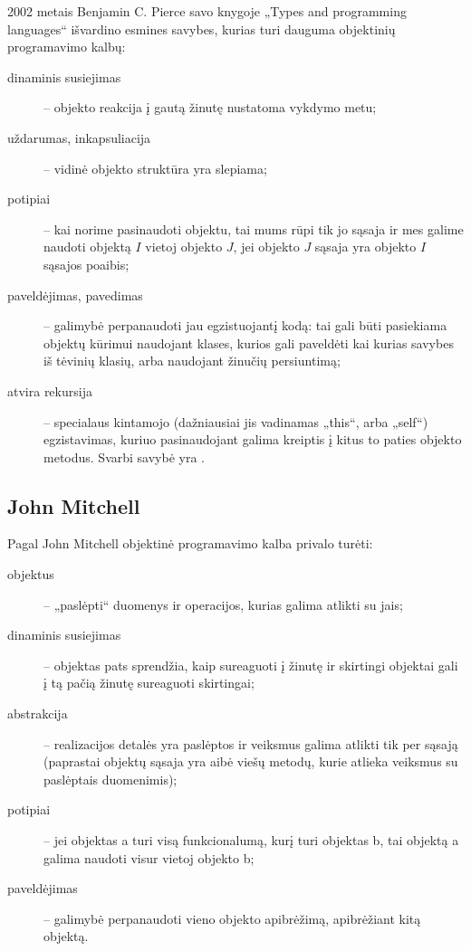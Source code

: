 2002 metais Benjamin C. Pierce savo knygoje „Types and programming
languages“\cite[225-227]{types-and-programming-languages} išvardino
esmines savybes, kurias turi dauguma objektinių programavimo kalbų: 
\begin{description}
  \item[dinaminis susiejimas]  –
    objekto reakcija į gautą žinutę nustatoma vykdymo metu;
  \item[uždarumas, inkapsuliacija]  – vidinė objekto
    struktūra yra slepiama;
  \item[potipiai]  – kai norime pasinaudoti objektu, 
    tai mums rūpi tik jo sąsaja ir mes galime naudoti objektą $I$ vietoj
    objekto $J$, jei objekto $J$ sąsaja yra objekto $I$ sąsajos poaibis;
  \item[paveldėjimas, pavedimas]  – galimybė
    perpanaudoti jau egzistuojantį kodą: tai gali būti pasiekiama
    objektų kūrimui naudojant klases, kurios gali paveldėti kai kurias
    savybes iš tėvinių klasių, arba naudojant žinučių persiuntimą;
  \item[atvira rekursija]  – specialaus kintamojo
    (dažniausiai jis vadinamas „this“, arba „self“) egzistavimas, kuriuo
    pasinaudojant galima kreiptis į kitus to paties objekto metodus.
    Svarbi savybė yra .
\end{description}

\subsection{John Mitchell}

Pagal John Mitchell \cite[277]{concepts-in-programming-languages}
objektinė programavimo kalba  privalo
turėti:
\begin{description}
  \item[objektus] – „paslėpti“ duomenys ir operacijos, kurias galima
    atlikti su jais;
  \item[dinaminis susiejimas]  – objektas pats
    sprendžia, kaip sureaguoti į žinutę ir skirtingi objektai gali
    į tą pačią žinutę sureaguoti skirtingai;
  \item[abstrakcija]  – realizacijos detalės yra
    paslėptos ir veiksmus galima atlikti tik per sąsają (paprastai
    objektų sąsaja yra aibė viešų metodų, kurie atlieka veiksmus
    su paslėptais duomenimis);
  \item[potipiai]  – jei objektas a turi visą funkcionalumą,
    kurį turi objektas b, tai objektą a galima naudoti visur vietoj
    objekto b;
  \item[paveldėjimas]  – galimybė perpanaudoti vieno
    objekto apibrėžimą, apibrėžiant kitą objektą.
\end{description}

